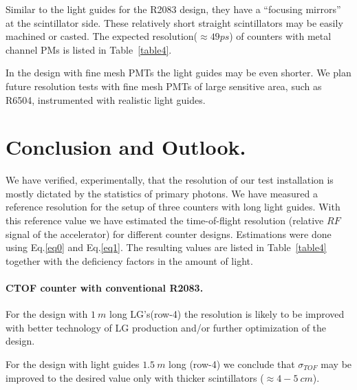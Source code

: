  Similar to the light guides for the R2083 design, they have a ``focusing mirrors'' at the scintillator side.
These relatively short straight scintillators may be easily 
machined or casted.
The expected resolution($\approx49ps$) of   
counters with metal channel PMs is  listed in Table~\ref{table4}.

  In  the  design with fine mesh PMTs the light guides  may be even shorter.
We  plan future resolution  tests 
with  fine mesh PMTs of large sensitive area, such as R6504,
instrumented with  realistic light guides.




\section{Conclusion and Outlook.}

We have verified,  experimentally,  
that  the resolution of our test  installation  is mostly dictated 
by the statistics of primary photons.
We have measured a reference resolution  for the setup of three counters with long light guides.
With this  reference  value  we  have  estimated  the  time-of-flight resolution
(relative $RF$ signal of the accelerator) for different   counter designs.
Estimations  were done   using  Eq.\ref{eq0} and  Eq.\ref{eq1}. 
The resulting values  are listed in Table~\ref{table4} together with the 
deficiency  factors  in  the amount of light.

\paragraph{CTOF counter with conventional R2083.}

For the design with $1~m$ long  LG's(row-4) the resolution is likely to be improved
with better technology of LG production
and/or further optimization of the design.

For the design with light guides $1.5~m$ long (row-4)   we conclude  that   $\sigma_{TOF}$  
may be improved to the desired value only 
with  thicker scintillators  ($\approx 4-5~cm$). 

